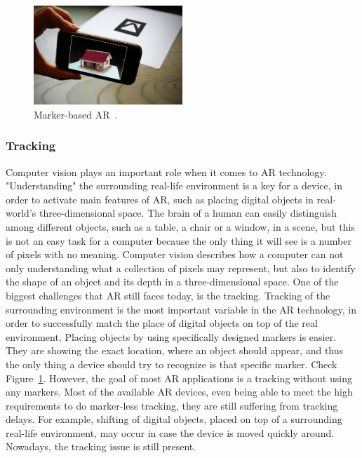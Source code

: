 \documentclass[12pt]{article}
\begin{document}
\begin{figure} [ht]
    \centering
    \includegraphics[width=0.50\textwidth]{../images/ar-marker.jpg}
    \caption{Marker-based AR~\cite{arMarker}.}
    \label{fig:ar_marker}
\end{figure}

\subsubsection{Tracking} \label{sec:Tracking}
Computer vision plays an important role when it comes to \ac{AR} technology. "Understanding" the surrounding real-life environment is a key for a device, in order to activate main features of \ac{AR}, such as placing digital objects in real-world's three-dimensional space. The brain of a human can easily distinguish among different objects, such as a table, a chair or a window, in a scene, but this is not an easy task for a computer because the only thing it will see is a number of pixels with no meaning. Computer vision describes how a computer can not only understanding what a collection of pixels may represent, but also to identify the shape of an object and its depth in a three-dimensional space. One of the biggest challenges that \ac{AR} still faces today, is the tracking. Tracking of the surrounding environment is the most important variable in the \ac{AR} technology, in order to successfully match the place of digital objects on top of the real environment. Placing objects by using specifically designed markers is easier. They are showing the exact location, where an object should appear, and thus the only thing a device should try to recognize is that specific marker. Check Figure~\ref{fig:ar_marker}. However, the goal of most \ac{AR} applications is a tracking without using any markers. Most of the available \ac{AR} devices, even being able to meet the high requirements to do marker-less tracking, they are still suffering from tracking delays. For example, shifting of digital objects, placed on top of a surrounding real-life environment, may occur in case the device is moved quickly around. Nowadays, the tracking issue is still present.
\end{document}
